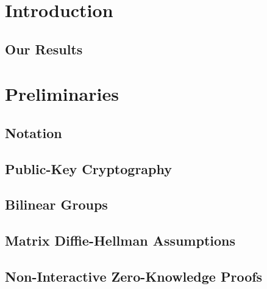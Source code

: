 \chapter{Introduction} \label{sec:intro}

    

    \section{Our Results}

        



\chapter{Preliminaries} \label{sec:prelim}

    \section{Notation} \label{sec:notation}

        

    \section{Public-Key Cryptography}

        

    \section{Bilinear Groups} \label{sec:bil-groups}

        

    \section{Matrix Diffie-Hellman  Assumptions} \label{sec:mddh}

        

    \section{Non-Interactive Zero-Knowledge Proofs} \label{sec:zk}

